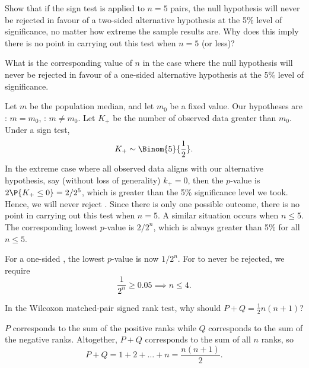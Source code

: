 \begin{problem}
    Show that if the sign test is applied to $n = 5$ pairs, the null hypothesis will never be rejected in favour of a two-sided alternative hypothesis at the 5\% level of significance, no matter how extreme the sample results are. Why does this imply there is no point in carrying out this test when $n = 5$ (or less)?

    What is the corresponding value of $n$ in the case where the null hypothesis will never be rejected in favour of a one-sided alternative hypothesis at the 5\% level of significance.
\end{problem}
\begin{solution}
    Let $m$ be the population median, and let $m_0$ be a fixed value. Our hypotheses are \nullhyp: $m = m_0$, \althyp: $m \neq m_0$. Let $K_+$ be the number of observed data greater than $m_0$. Under a sign test, \[K_+ \sim \Binom{5}{\frac12}.\] In the extreme case where all observed data aligns with our alternative hypothesis, say (without loss of generality) $k_+ = 0$, then the $p$-value is $2\P{K_+ \leq 0} = 2/2^5$, which is greater than the 5\% significance level we took. Hence, we will never reject \nullhyp{}. Since there is only one possible outcome, there is no point in carrying out this test when $n = 5$. A similar situation occurs when $n \leq 5$. The corresponding lowest $p$-value is $2/2^n$, which is always greater than 5\% for all $n \leq 5$.

    For a one-sided \althyp, the lowest $p$-value is now $1/2^n$. For \nullhyp{} to never be rejected, we require \[\frac1{2^n} \geq 0.05 \implies n \leq 4.\]
\end{solution}

\begin{problem}
    In the Wilcoxon matched-pair signed rank test, why should $P + Q = \frac12 n (n+1)$?
\end{problem}
\begin{solution}
    $P$ corresponds to the sum of the positive ranks while $Q$ corresponds to the sum of the negative ranks. Altogether, $P + Q$ corresponds to the sum of all $n$ ranks, so \[P + Q = 1 + 2 + \dots + n = \frac{n(n+1)}{2}.\]
\end{solution}

